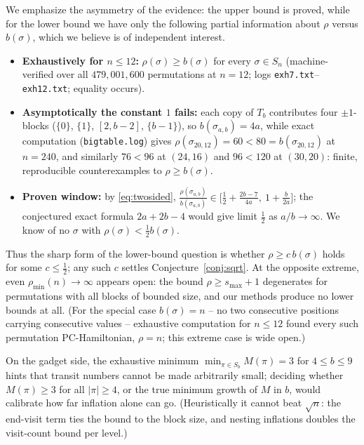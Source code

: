 \documentclass[11pt]{article}
\theoremstyle{definition}
\newcommand{\pmin}{\rho_{\min}}
\newcommand{\smax}{s_{\max}}
\begin{document}
We emphasize the asymmetry of the evidence: the upper bound is proved, while for the
lower bound we have only the following partial information about $\rho$ versus
$b(\sigma)$, which we believe is of independent interest.
\begin{itemize}
\item \textbf{Exhaustively for $n \le 12$:} $\rho(\sigma) \ge b(\sigma)$ for every
$\sigma \in S_n$ (machine-verified over all $479{,}001{,}600$ permutations at $n = 12$;
logs \texttt{exh7.txt}--\texttt{exh12.txt}; equality occurs).
\item \textbf{Asymptotically the constant $1$ fails:} each copy of $T_b$ contributes
four $\pm1$-blocks ($\{0\}$, $\{1\}$, $[2, b-2]$, $\{b-1\}$), so $b(\sigma_{a,b}) = 4a$,
while exact computation (\texttt{bigtable.log}) gives $\rho(\sigma_{20,12}) = 60 < 80 =
b(\sigma_{20,12})$ at $n = 240$, and similarly $76 < 96$ at $(24,16)$ and $96 < 120$ at
$(30,20)$: finite, reproducible counterexamples to $\rho \ge b(\sigma)$.
\item \textbf{Proven window:} by \eqref{eq:twosided},
$\tfrac{\rho(\sigma_{a,b})}{b(\sigma_{a,b})} \in \bigl[\tfrac12 +
\tfrac{2b-7}{4a},\ 1 + \tfrac{b}{2a}\bigr]$; the conjectured exact formula
$2a + 2b - 4$ would give limit $\tfrac12$ as $a/b \to \infty$. We know of no $\sigma$
with $\rho(\sigma) < \tfrac12 b(\sigma)$.
\end{itemize}
Thus the sharp form of the lower-bound question is whether $\rho \ge c\,b(\sigma)$ holds
for some $c \le \tfrac12$; any such $c$ settles Conjecture~\ref{conj:sqrt}. At the
opposite extreme, even $\pmin(n) \to \infty$ appears open: the bound $\rho \ge \smax +
1$ degenerates for permutations with all blocks of bounded size, and our methods produce
no lower bounds at all. (For the special case $b(\sigma) = n$ -- no two consecutive
positions carrying consecutive values -- exhaustive computation for $n \le 12$ found
every such permutation PC-Hamiltonian, $\rho = n$; this extreme case is wide open.)

On the gadget side, the exhaustive minimum $\min_{\pi \in S_b} M(\pi) = 3$ for
$4 \le b \le 9$ hints that transit numbers cannot be made arbitrarily small; deciding
whether $M(\pi) \ge 3$ for all $|\pi| \ge 4$, or the true minimum growth of $M$ in $b$,
would calibrate how far inflation alone can go. (Heuristically it cannot beat $\sqrt n$:
the end-visit term ties the bound to the block size, and nesting inflations doubles the
visit-count bound per level.)
\end{document}

